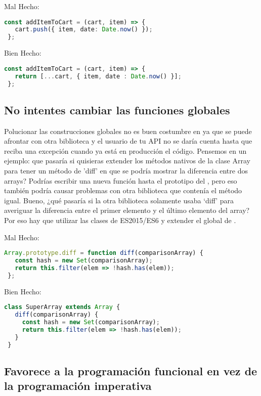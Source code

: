Mal Hecho:
\begin{lstlisting}[language=TypeScript, style=badstyle]
 const addItemToCart = (cart, item) => {
   cart.push({ item, date: Date.now() });
 };
\end{lstlisting}
\vspace{0.5cm} %

Bien Hecho:
\begin{lstlisting}[language=TypeScript, style=goodstyle]
 const addItemToCart = (cart, item) => {
   return [...cart, { item, date : Date.now() }];
 };
\end{lstlisting}
\newpage

\subsection*{No intentes cambiar las funciones globales}

Polucionar las construcciones globales no es buen costumbre en  ya que se puede afrontar con otra biblioteca y el usuario de tu API no se daría cuenta hasta que reciba una excepción cuando ya está en producción el código. Pensemos en un ejemplo: que pasaría si quisieras extender los métodos nativos de la clase Array para tener un método de 'diff' en que se podría mostrar la diferencia entre dos arrays? Podrías escribir una nueva función hasta el prototipo del , pero eso también podría causar problemas con otra biblioteca que contenía el método igual. Bueno, ¿qué pasaría si la otra biblioteca solamente usaba ‘diff’ para averiguar la diferencia entre el primer elemento y el último elemento del array? Por eso hay que utilizar las clases de ES2015/ES6 y extender el global de .

Mal Hecho:
\begin{lstlisting}[language=TypeScript, style=badstyle]
 Array.prototype.diff = function diff(comparisonArray) {
   const hash = new Set(comparisonArray);
   return this.filter(elem => !hash.has(elem));
 };
\end{lstlisting}
\vspace{0.5cm} %

Bien Hecho:
\begin{lstlisting}[language=TypeScript, style=goodstyle]
 class SuperArray extends Array {
   diff(comparisonArray) {
     const hash = new Set(comparisonArray);
     return this.filter(elem => !hash.has(elem));
   }
 }
\end{lstlisting}

\subsection*{Favorece a la programación funcional en vez de la programación imperativa}

